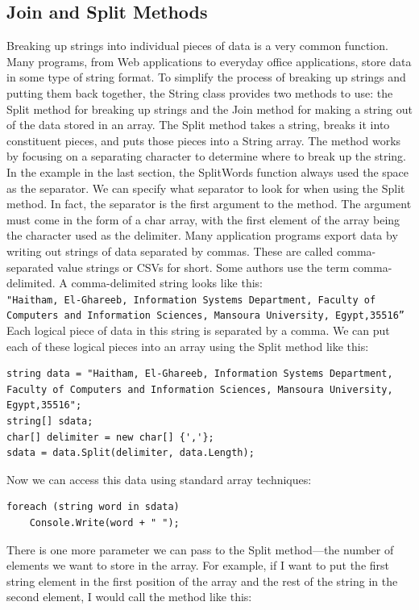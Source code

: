 \documentclass[12pt,a4paper,final,twoside,titlepage]{book}
\begin{document}
\subsection{Join and Split Methods}
Breaking up strings into individual pieces of data is a very common function. Many programs, from Web applications to everyday office applications, store data in some type of string format. To simplify the process of breaking up strings and putting them back together, the String class provides two methods to use: the Split method for breaking up strings and the Join method for making a string out of the data stored in an array. The Split method takes a string, breaks it into constituent pieces, and puts those pieces into a String array. The method works by focusing on a separating character to determine where to break up the string. In the example in the last section, the SplitWords function always used the space as the separator. We can specify what separator to look for when using the Split method. In fact, the separator is the first argument to the method. The argument must come in the form of a char array, with the first element of the array being the character used as the delimiter.
Many application programs export data by writing out strings of data separated by commas. These are called comma-separated value strings or CSVs for short. Some authors use the term comma-delimited. A comma-delimited string looks like this:\\
\texttt{"Haitham, El-Ghareeb, Information Systems Department, Faculty of Computers and Information Sciences, Mansoura University, Egypt,35516”}\\
Each logical piece of data in this string is separated by a comma. We can put each of these logical pieces into an array using the Split method like this:
\begin{lstlisting}
string data = "Haitham, El-Ghareeb, Information Systems Department, Faculty of Computers and Information Sciences, Mansoura University, Egypt,35516";
string[] sdata;
char[] delimiter = new char[] {','};
sdata = data.Split(delimiter, data.Length);
\end{lstlisting}
Now we can access this data using standard array techniques:
\begin{lstlisting}
foreach (string word in sdata)
    Console.Write(word + " ");
\end{lstlisting}
There is one more parameter we can pass to the Split method—the number of elements we want to store in the array. For example, if I want to put the first string element in the first position of the array and the rest of the string in the second element, I would call the method like this:
\end{document}
